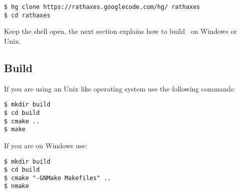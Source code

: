 \documentclass[american]{rtxarticle}
\begin{document}
\begin{lstlisting}
$ hg clone https://rathaxes.googlecode.com/hg/ rathaxes
$ cd rathaxes
\end{lstlisting}

Keep the shell open, the next section explains how to build \rtx\ on Windows or
Unix.

\subsection{Build \rtx}

If you are using an Unix like operating system use the following commands:

\begin{lstlisting}
$ mkdir build
$ cd build
$ cmake ..
$ make
\end{lstlisting}

If you are on Windows use:

\begin{lstlisting}
$ mkdir build
$ cd build
$ cmake "-GNMake Makefiles" ..
$ nmake
\end{lstlisting}

\rtxmaketitleblock
\end{document}
